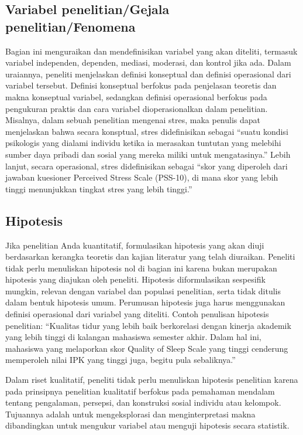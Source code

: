 \documentclass[
  indonesian,
  letterpaper,
]{scrbook}
\begin{document}
\subsection{Variabel penelitian/Gejala
penelitian/Fenomena}\label{variabel-penelitiangejala-penelitianfenomena}

Bagian ini menguraikan dan mendefinisikan variabel yang akan diteliti,
termasuk variabel independen, dependen, mediasi, moderasi, dan kontrol
jika ada. Dalam uraiannya, peneliti menjelaskan definisi konseptual dan
definisi operasional dari variabel tersebut. Definisi konseptual
berfokus pada penjelasan teoretis dan makna konseptual variabel,
sedangkan definisi operasional berfokus pada pengukuran praktis dan cara
variabel dioperasionalkan dalam penelitian. Misalnya, dalam sebuah
penelitian mengenai stres, maka penulis dapat menjelaskan bahwa secara
konsptual, stres didefinisikan sebagai ``suatu kondisi psikologis yang
dialami individu ketika ia merasakan tuntutan yang melebihi sumber daya
pribadi dan sosial yang mereka miliki untuk mengatasinya.'' Lebih
lanjut, secara operasional, stres didefinisikan sebagai ``skor yang
diperoleh dari jawaban kuesioner Perceived Stress Scale (PSS-10), di
mana skor yang lebih tinggi menunjukkan tingkat stres yang lebih
tinggi.''

\subsection{Hipotesis}\label{hipotesis}

Jika penelitian Anda kuantitatif, formulasikan hipotesis yang akan diuji
berdasarkan kerangka teoretis dan kajian literatur yang telah diuraikan.
Peneliti tidak perlu menuliskan hipotesis nol di bagian ini karena bukan
merupakan hipotesis yang diajukan oleh peneliti. Hipotesis
diformulasikan sespesifik mungkin, relevan dengan variabel dan populasi
penelitian, serta tidak ditulis dalam bentuk hipotesis umum. Perumusan
hipotesis juga harus menggunakan definisi operasional dari variabel yang
diteliti. Contoh penulisan hipotesis penelitian: ``Kualitas tidur yang
lebih baik berkorelasi dengan kinerja akademik yang lebih tinggi di
kalangan mahasiswa semester akhir. Dalam hal ini, mahasiswa yang
melaporkan skor Quality of Sleep Scale yang tinggi cenderung memperoleh
nilai IPK yang tinggi juga, begitu pula sebaliknya.''

Dalam riset kualitatif, peneliti tidak perlu menuliskan hipotesis
penelitian karena pada prinsipnya penelitian kualitatif berfokus pada
pemahaman mendalam tentang pengalaman, persepsi, dan konstruksi sosial
individu atau kelompok. Tujuannya adalah untuk mengeksplorasi dan
menginterpretasi makna dibandingkan untuk mengukur variabel atau menguji
hipotesis secara statistik.
\end{document}
